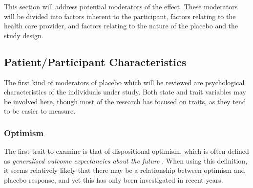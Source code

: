 This section will address potential moderators of the effect.
These moderators will be divided into factors inherent to the participant, factors relating to the health care provider, and factors relating to the nature of the placebo and the study design. 





\subsection{Patient/Participant Characteristics}
\label{sec:psych-char}

The first kind of moderators of placebo which will be reviewed are psychological characteristics of the individuals under study. Both state and trait variables may be involved here, though most of the research has focused on traits, as they tend to be easier to measure. 

\subsubsection{Optimism}
\label{sec:optimism}

The first trait to examine is that of dispositional optimism, which is often defined as \textit{generalised outcome expectancies about the future} \cite{Carver2010}. When using this definition, it seems relatively likely that there may be a relationship between optimism and placebo response, and yet this has only been investigated in recent years. 

